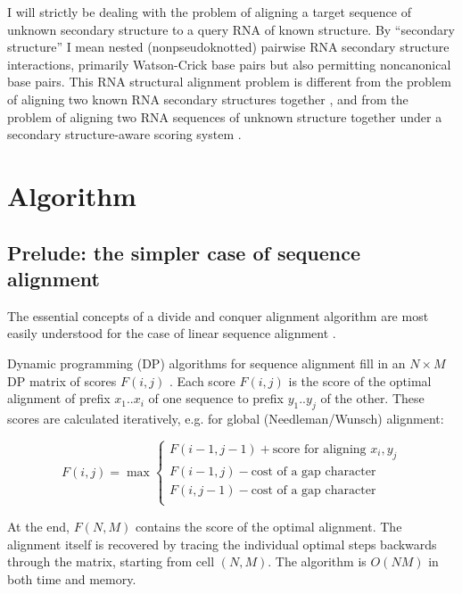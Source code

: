 \documentclass[11pt]{article}
\begin{document}
I will strictly be dealing with the problem of aligning a target
sequence of unknown secondary structure to a query RNA of known
structure. By ``secondary structure'' I mean nested (nonpseudoknotted)
pairwise RNA secondary structure interactions, primarily Watson-Crick
base pairs but also permitting noncanonical base pairs. This RNA
structural alignment problem is different from the problem of aligning
two known RNA secondary structures together \cite{Shapiro90}, and from
the problem of aligning two RNA sequences of unknown structure
together under a secondary structure-aware scoring system
\cite{Sankoff85,Gorodkin01,MathewsTurner02}.

\section{Algorithm}

\subsection{Prelude: the simpler case of sequence alignment}

The essential concepts of a divide and conquer alignment algorithm are
most easily understood for the case of linear sequence alignment
\cite{Hirschberg75,MyM-88a}.

Dynamic programming (DP) algorithms for sequence alignment fill in an
$N \times M$ DP matrix of scores $F(i,j)$
\cite{Needleman70,Smith81}. Each score $F(i,j)$ is the score of the
optimal alignment of prefix $x_1..x_i$ of one sequence to prefix
$y_1..y_j$ of the other. These scores are calculated iteratively, e.g.
for global (Needleman/Wunsch) alignment:

\[  F(i,j) = \max \left\{ \begin{array}{l}
                       F(i-1,j-1) + \mbox{score for aligning $x_i, y_j$} \\
                       F(i-1,j) - \mbox{cost of a gap character} \\
                       F(i,j-1) - \mbox{cost of a gap character} \\
                       \end{array} \right. \]

At the end, $F(N,M)$ contains the score of the optimal alignment. The
alignment itself is recovered by tracing the individual optimal steps
backwards through the matrix, starting from cell $(N,M)$. The
algorithm is $O(NM)$ in both time and memory.
\end{document}
